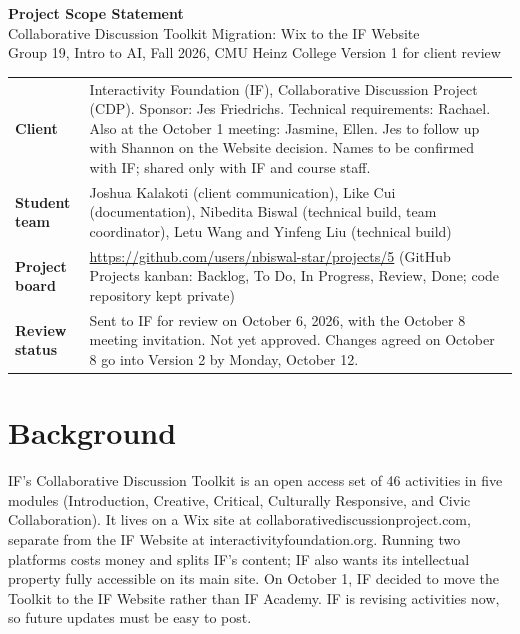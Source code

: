 


\begin{center}
{\LARGE\bfseries Project Scope Statement}\\[3pt]
{\large Collaborative Discussion Toolkit Migration: Wix to the IF Website}\\[2pt]
{\small Group 19, Intro to AI, Fall 2026, CMU Heinz College \textbullet{} Version 1 for client review}
\end{center}

\begin{tabularx}{\textwidth}{@{}>{\bfseries}P{3.4cm}L@{}}
Client & Interactivity Foundation (IF), Collaborative Discussion Project (CDP). Sponsor: Jes Friedrichs. Technical requirements: Rachael. Also at the October 1 meeting: Jasmine, Ellen. Jes to follow up with Shannon on the Website decision. Names to be confirmed with IF; shared only with IF and course staff. \\
Student team & Joshua Kalakoti (client communication), Like Cui (documentation), Nibedita Biswal (technical build, team coordinator), Letu Wang and Yinfeng Liu (technical build) \\
Project board & \url{https://github.com/users/nbiswal-star/projects/5} (GitHub Projects kanban: Backlog, To Do, In Progress, Review, Done; code repository kept private) \\
Review status & Sent to IF for review on October 6, 2026, with the October 8 meeting invitation. Not yet approved. Changes agreed on October 8 go into Version 2 by Monday, October 12. \\
\end{tabularx}

\section{Background}
\begin{sloppypar}
IF's Collaborative Discussion Toolkit is an open access set of 46 activities in five modules (Introduction, Creative, Critical, Culturally Responsive, and Civic Collaboration). It lives on a Wix site at \mbox{collaborativediscussionproject.com}, separate from the IF Website at interactivityfoundation.org. Running two platforms costs money and splits IF's content; IF also wants its intellectual property fully accessible on its main site. On October 1, IF decided to move the Toolkit to the IF Website rather than IF Academy. IF is revising activities now, so future updates must be easy to post.
\end{sloppypar}

